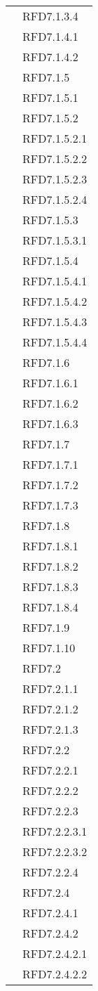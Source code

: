 \begin{longtable}{|>{\centering}m{10cm}|m{3cm}<{\centering}|}
& RFD7.1.3.4\\
& RFD7.1.4.1\\
& RFD7.1.4.2\\
& RFD7.1.5\\
& RFD7.1.5.1\\
& RFD7.1.5.2\\
& RFD7.1.5.2.1\\
& RFD7.1.5.2.2\\
& RFD7.1.5.2.3\\
& RFD7.1.5.2.4\\
& RFD7.1.5.3\\
& RFD7.1.5.3.1\\
& RFD7.1.5.4\\
& RFD7.1.5.4.1\\
& RFD7.1.5.4.2\\
& RFD7.1.5.4.3\\
& RFD7.1.5.4.4\\
& RFD7.1.6\\
& RFD7.1.6.1\\
& RFD7.1.6.2\\
& RFD7.1.6.3\\
& RFD7.1.7\\
& RFD7.1.7.1\\
& RFD7.1.7.2\\
& RFD7.1.7.3\\
& RFD7.1.8\\
& RFD7.1.8.1\\
& RFD7.1.8.2\\
& RFD7.1.8.3\\
& RFD7.1.8.4\\
& RFD7.1.9\\
& RFD7.1.10\\
& RFD7.2\\
& RFD7.2.1.1\\
& RFD7.2.1.2\\
& RFD7.2.1.3\\
& RFD7.2.2\\
& RFD7.2.2.1\\
& RFD7.2.2.2\\
& RFD7.2.2.3\\
& RFD7.2.2.3.1\\
& RFD7.2.2.3.2\\
& RFD7.2.2.4\\
& RFD7.2.4\\
& RFD7.2.4.1\\
& RFD7.2.4.2\\
& RFD7.2.4.2.1\\
& RFD7.2.4.2.2\\

\end{longtable}
